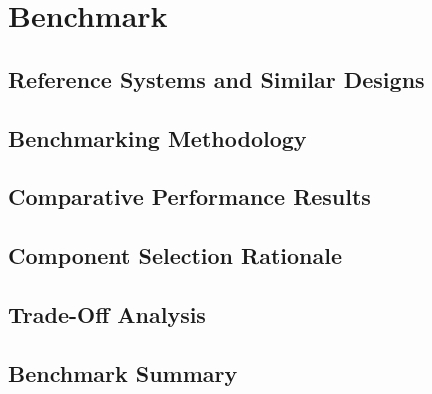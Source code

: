 \chapter{Benchmark}

\section{Reference Systems and Similar Designs}

\section{Benchmarking Methodology}

\section{Comparative Performance Results}

\section{Component Selection Rationale}

\section{Trade-Off Analysis}

\section{Benchmark Summary}
